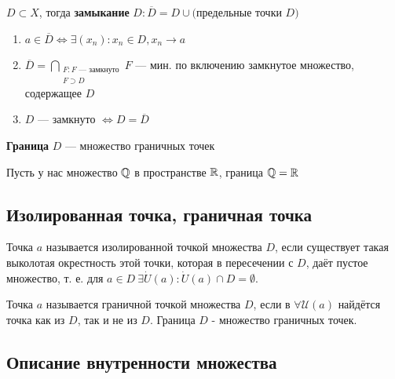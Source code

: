 	\begin{definition}
		$D \subset X$, тогда \textbf{замыкание} $D: \overline{D} = D \cup \text{(предельные точки }D)$
	\end{definition}
	
	\begin{remark} \nobreakspace
		\begin{enumerate}
		  \item $a \in \overline{D} \Leftrightarrow \exists (x_n) : x_n \in D, x_n \to a$
		  \item $\overline{D} = \bigcap\limits_{\substack{F : F \text{ --- замкнуто} \\ F \supset D}} F$ --- мин. по включению замкнутое множество, содержащее $D$
		  \item $D$ --- замкнуто $\Leftrightarrow D = \overline{D}$
		\end{enumerate}		
	\end{remark}
	
	\begin{definition}
		\textbf{Граница} $D$ --- множество граничных точек
	\end{definition}
	
	\begin{example}
		Пусть у нас множество $\operatorname*{\mathbb{Q}}$ в пространстве $\operatorname*{\mathbb{R}}$, граница $\operatorname*{\mathbb{Q}} = \operatorname*{\mathbb{R}}$	
	\end{example}

\newpage
{}
\subsection{Изолированная точка, граничная точка}

\begin{definition}
    Точка $a$ называется изолированной точкой множества $D$, если существует такая выколотая окрестность этой точки, которая в пересечении с $D$, даёт пустое множество, т. е. для $a \in D \ \exists \dot U(a): \dot U(a) \cap D = \emptyset$.
\end{definition}

\begin{definition}
    Точка $a$ называется граничной точкой множества $D$, если в $\forall \mathcal{U}(a)$ найдётся точка как из $D$, так и не из $D$. Граница $D$ - множество граничных точек.
\end{definition}


\newpage
\subsection{Описание внутренности множества}

